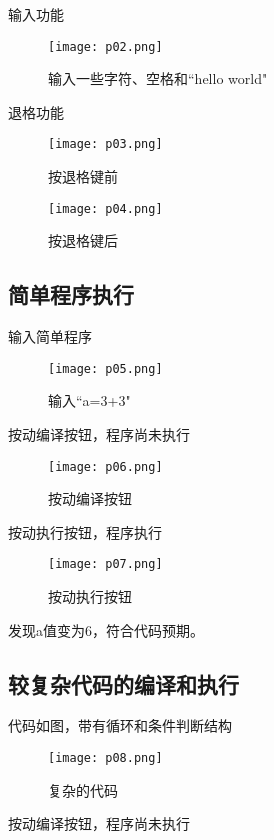 \documentclass[lang=cn,11pt,a4paper]{elegantpaper}
\begin{document}
输入功能

\begin{figure}[H]
	\centering
	\texttt{[image: p02.png]}
	\caption{输入一些字符、空格和“hello world"}
\end{figure}

退格功能

\begin{figure}[H]
	\centering
	\texttt{[image: p03.png]}
	\caption{按退格键前}
\end{figure}


\begin{figure}[H]
	\centering
	\texttt{[image: p04.png]}
	\caption{按退格键后}
\end{figure}

\subsection{简单程序执行}

输入简单程序

\begin{figure}[H]
	\centering
	\texttt{[image: p05.png]}
	\caption{输入“a=3+3"}
\end{figure}

按动编译按钮，程序尚未执行

\begin{figure}[H]
	\centering
	\texttt{[image: p06.png]}
	\caption{按动编译按钮}
\end{figure}

按动执行按钮，程序执行

\begin{figure}[H]
	\centering
	\texttt{[image: p07.png]}
	\caption{按动执行按钮}
\end{figure}

发现a值变为6，符合代码预期。

\subsection{较复杂代码的编译和执行}

代码如图，带有循环和条件判断结构

\begin{figure}[H]
	\centering
	\texttt{[image: p08.png]}
	\caption{复杂的代码}
\end{figure}

按动编译按钮，程序尚未执行
\end{document}
